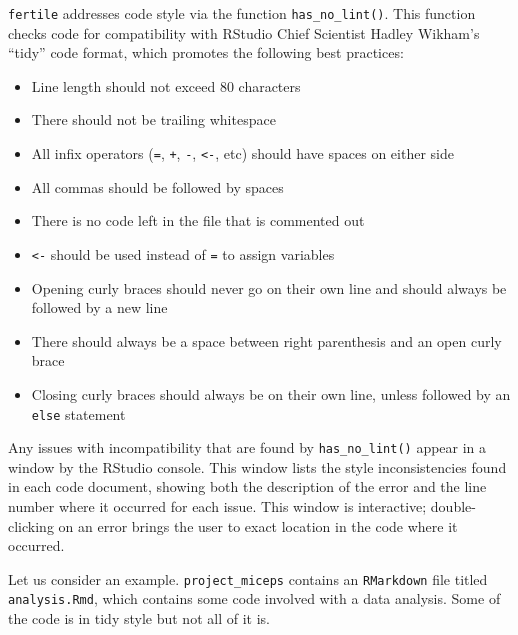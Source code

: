 \documentclass[12pt,twoside]{reedthesis}
\providecommand{\tightlist}{%
  \setlength{\itemsep}{0pt}\setlength{\parskip}{0pt}}
\begin{document}
\texttt{fertile} addresses code style via the function
\texttt{has\_no\_lint()}. This function checks code for compatibility
with RStudio Chief Scientist Hadley Wikham's ``tidy'' code format, which
promotes the following best practices:
\begin{itemize}
\tightlist
\item
  Line length should not exceed 80 characters
\item
  There should not be trailing whitespace
\item
  All infix operators (\texttt{=}, \texttt{+}, \texttt{-},
  \texttt{\textless{}-}, etc) should have spaces on either side
\item
  All commas should be followed by spaces
\item
  There is no code left in the file that is commented out
\item
  \texttt{\textless{}-} should be used instead of \texttt{=} to assign
  variables
\item
  Opening curly braces should never go on their own line and should
  always be followed by a new line
\item
  There should always be a space between right parenthesis and an open
  curly brace
\item
  Closing curly braces should always be on their own line, unless
  followed by an \texttt{else} statement
\end{itemize}
Any issues with incompatibility that are found by
\texttt{has\_no\_lint()} appear in a window by the RStudio console. This
window lists the style inconsistencies found in each code document,
showing both the description of the error and the line number where it
occurred for each issue. This window is interactive; double-clicking on
an error brings the user to exact location in the code where it
occurred.

Let us consider an example. \texttt{project\_miceps} contains an
\texttt{RMarkdown} file titled \texttt{analysis.Rmd}, which contains
some code involved with a data analysis. Some of the code is in tidy
style but not all of it is.
\end{document}
